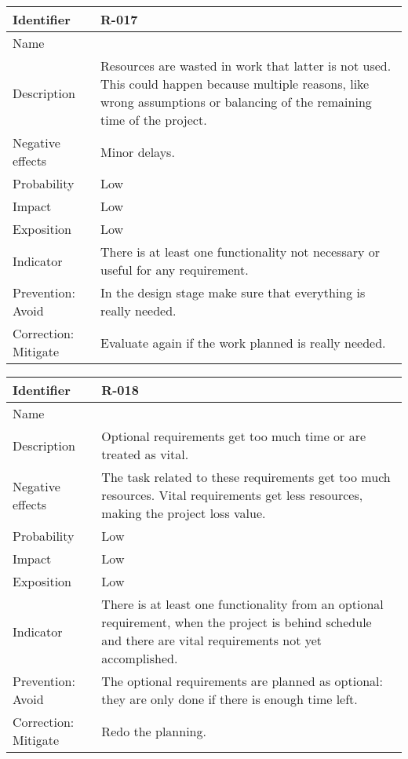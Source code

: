 \begin{table}[H]
	\begin{tabularx}{\textwidth}{|y|z|}
		\hline
		Identifier & \textbf{R-017} \\ \hline
		Name & \Rdiecisiete \\ \hline
		Description &
			Resources are wasted in work that latter is not used. \linej
			This could happen because multiple reasons, like wrong assumptions or balancing of the remaining time of the project.
		\\ \hline
		Negative effects &
			Minor delays.
		\\ \hline
		Probability & Low\\ \hline
		Impact &  Low\\ \hline
		Exposition &  Low\\ \hline
		Indicator & There is at least one functionality not necessary or useful for any requirement.\\ \hline
		Prevention: Avoid &
			In the design stage make sure that everything is really needed.
		\\ \hline
		Correction: Mitigate &
			Evaluate again if the work planned is really needed.
		\\ \hline
	\end{tabularx}
\end{table}

\begin{table}[H]
	\begin{tabularx}{\textwidth}{|y|z|}
		\hline
		Identifier & \textbf{R-018} \\ \hline
		Name & \Rdieciocho \\ \hline
		Description &
			Optional requirements get too much time or are treated as vital.
		\\ \hline
		Negative effects &
			The task related to these requirements get too much resources.\linej
			Vital requirements get less resources, making the project loss value.
		\\ \hline
		Probability & Low\\ \hline
		Impact &  Low\\ \hline
		Exposition &  Low\\ \hline
		Indicator & There is at least one functionality from an optional requirement, when the project is behind schedule and there are vital requirements not yet accomplished.\\ \hline
		Prevention: Avoid &
			The optional requirements are planned as optional: they are only done if there is enough time left.
		\\ \hline
		Correction: Mitigate &
			Redo the planning.
		\\ \hline
	\end{tabularx}
\end{table}











